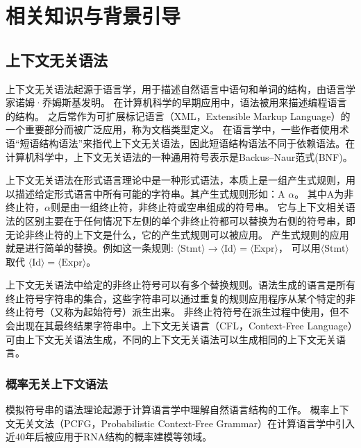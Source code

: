 
\chapter{相关知识与背景引导}

\section{上下文无关语法}

上下文无关语法起源于语言学，用于描述自然语言中语句和单词的结构，由语言学家诺姆·乔姆斯基发明。
在计算机科学的早期应用中，语法被用来描述编程语言的结构。
之后常作为可扩展标记语言（XML，Extensible Markup Language）的一个重要部分而被广泛应用，称为文档类型定义\cite{hopcroft2001introduction}。
在语言学中，一些作者使用术语“短语结构语法”来指代上下文无关语法，因此短语结构语法不同于依赖语法。在计算机科学中，上下文无关语法的一种通用符号表示是Backus–Naur范式(BNF)。

上下文无关语法在形式语言理论中是一种形式语法，本质上是一组产生式规则，用以描述给定形式语言中所有可能的字符串。其产生式规则形如：A \rightarrow $\alpha$。
其中A为非终止符，$\alpha$则是由一组终止符，非终止符或空串组成的符号串。
它与上下文相关语法的区别主要在于任何情况下左侧的单个非终止符都可以替换为右侧的符号串，即无论非终止符的上下文是什么，它的产生式规则可以被应用。
产生式规则的应用就是进行简单的替换。例如这一条规则: $\displaystyle \langle {\text{Stmt}}\rangle \to \langle {\text{Id}}\rangle =\langle {\text{Expr}}\rangle$，
可以用$\displaystyle \langle {\text{Stmt}}\rangle$ 取代 $\langle {\text{Id}}\rangle =\langle {\text{Expr}}\rangle$。

上下文无关语法中给定的非终止符号可以有多个替换规则。语法生成的语言是所有终止符号字符串的集合，这些字符串可以通过重复的规则应用程序从某个特定的非终止符号（又称为起始符号）派生出来。
非终止符符号在派生过程中使用，但不会出现在其最终结果字符串中。上下文无关语言（CFL，Context-Free Language）可由上下文无关语法生成，不同的上下文无关语法可以生成相同的上下文无关语言。

\subsection{概率无关上下文语法}

模拟符号串的语法理论起源于计算语言学中理解自然语言结构的工作\cite{chomsky1956three,chomsky1959certain,lees1957syntactic}。
概率上下文无关文法（PCFG，Probabilistic Context-Free Grammar）在计算语言学中引入近40年后被应用于RNA结构的概率建模等领域\cite{sakakibara1994stochastic}。

